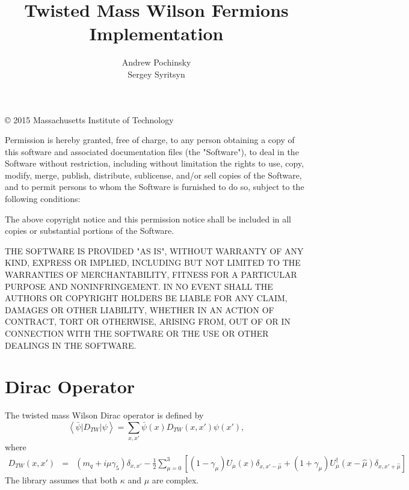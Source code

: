 \documentclass[twoside,openright,letterpaper]{article}
\title{Twisted Mass Wilson Fermions Implementation}
\author{Andrew Pochinsky\\Sergey Syritsyn}
\begin{document}
\maketitle
\thispagestyle{empty}\hbox{}
\vfill
\copyright{} 2015 Massachusetts Institute of Technology

Permission is hereby granted, free of charge, to any person obtaining
a copy of this software and associated documentation files (the
"Software"), to deal in the Software without restriction, including
without limitation the rights to use, copy, modify, merge, publish,
distribute, sublicense, and/or sell copies of the Software, and to
permit persons to whom the Software is furnished to do so, subject to
the following conditions:

The above copyright notice and this permission notice shall be
included in all copies or substantial portions of the Software.

THE SOFTWARE IS PROVIDED "AS IS", WITHOUT WARRANTY OF ANY KIND,
EXPRESS OR IMPLIED, INCLUDING BUT NOT LIMITED TO THE WARRANTIES OF
MERCHANTABILITY, FITNESS FOR A PARTICULAR PURPOSE AND
NONINFRINGEMENT. IN NO EVENT SHALL THE AUTHORS OR COPYRIGHT HOLDERS BE
LIABLE FOR ANY CLAIM, DAMAGES OR OTHER LIABILITY, WHETHER IN AN ACTION
OF CONTRACT, TORT OR OTHERWISE, ARISING FROM, OUT OF OR IN CONNECTION
WITH THE SOFTWARE OR THE USE OR OTHER DEALINGS IN THE SOFTWARE.
\pagebreak

\tableofcontents
\vfill
\pagebreak

\section{Dirac Operator}

The twisted mass Wilson Dirac operator is defined by
\begin{equation}
\left\langle\bar\psi|D_{TW}|\psi\right\rangle =
  \sum_{x,x'}\bar\psi(x)D_{TW}(x,x')\psi(x'),
\end{equation}
where
\begin{eqnarray}
D_{TW}(x,x')  &= & (m_q + i \mu \gamma_5)\delta_{x,x'} 
   - \frac{1}{2}\sum_{\mu=0}^3\left[(1-\gamma_\mu) U_\mu(x)\delta_{x,x'-\hat\mu}
         +(1+\gamma_\mu) U_\mu^\dagger(x-\hat\mu)\delta_{x,x'+\hat\mu}\right]
\label{action-W}
\end{eqnarray}
The library assumes that both $\kappa$ and $\mu$ are complex.
\vfill
\pagebreak
\end{document}
